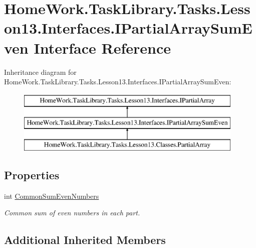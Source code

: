 \hypertarget{interface_home_work_1_1_task_library_1_1_tasks_1_1_lesson13_1_1_interfaces_1_1_i_partial_array_sum_even}{}\section{Home\+Work.\+Task\+Library.\+Tasks.\+Lesson13.\+Interfaces.\+I\+Partial\+Array\+Sum\+Even Interface Reference}
\label{interface_home_work_1_1_task_library_1_1_tasks_1_1_lesson13_1_1_interfaces_1_1_i_partial_array_sum_even}
Inheritance diagram for Home\+Work.\+Task\+Library.\+Tasks.\+Lesson13.\+Interfaces.\+I\+Partial\+Array\+Sum\+Even\+:\begin{figure}[H]
\begin{center}
\leavevmode
\includegraphics[height=3.000000cm]{interface_home_work_1_1_task_library_1_1_tasks_1_1_lesson13_1_1_interfaces_1_1_i_partial_array_sum_even}
\end{center}
\end{figure}
\subsection*{Properties}
\begin{DoxyCompactItemize}
\item 
int \mbox{\hyperlink{interface_home_work_1_1_task_library_1_1_tasks_1_1_lesson13_1_1_interfaces_1_1_i_partial_array_sum_even_adb731dd776707d69635ad2e37932f1ea}{Common\+Sum\+Even\+Numbers}}
\begin{DoxyCompactList}\small\item\em Common sum of even numbers in each part. \end{DoxyCompactList}\end{DoxyCompactItemize}
\subsection*{Additional Inherited Members}


